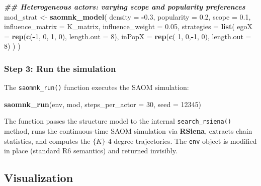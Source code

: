\documentclass[
]{article}
\newenvironment{Shaded}{\begin{snugshade}}{\end{snugshade}}
\newcommand{\AttributeTok}[1]{\textcolor[rgb]{0.13,0.29,0.53}{#1}}
\newcommand{\DecValTok}[1]{\textcolor[rgb]{0.00,0.00,0.81}{#1}}
\newcommand{\DocumentationTok}[1]{\textcolor[rgb]{0.56,0.35,0.01}{\textbf{\textit{#1}}}}
\newcommand{\FloatTok}[1]{\textcolor[rgb]{0.00,0.00,0.81}{#1}}
\newcommand{\FunctionTok}[1]{\textcolor[rgb]{0.13,0.29,0.53}{\textbf{#1}}}
\newcommand{\NormalTok}[1]{#1}
\newcommand{\OtherTok}[1]{\textcolor[rgb]{0.56,0.35,0.01}{#1}}
\newcommand{\SpecialCharTok}[1]{\textcolor[rgb]{0.81,0.36,0.00}{\textbf{#1}}}
\begin{document}
\begin{Shaded}
\begin{Highlighting}[]
\DocumentationTok{\#\# Heterogeneous actors: varying scope and popularity preferences}
\NormalTok{mod\_strat }\OtherTok{\textless{}{-}} \FunctionTok{saomnk\_model}\NormalTok{(}
  \AttributeTok{density    =} \SpecialCharTok{{-}}\FloatTok{0.3}\NormalTok{,}
  \AttributeTok{popularity =}  \FloatTok{0.2}\NormalTok{,}
  \AttributeTok{scope      =}  \FloatTok{0.1}\NormalTok{,}
  \AttributeTok{influence\_matrix =}\NormalTok{ K\_matrix,}
  \AttributeTok{influence\_weight =} \FloatTok{0.05}\NormalTok{,}
  \AttributeTok{strategies =} \FunctionTok{list}\NormalTok{(}
    \AttributeTok{egoX   =} \FunctionTok{rep}\NormalTok{(}\FunctionTok{c}\NormalTok{(}\SpecialCharTok{{-}}\DecValTok{1}\NormalTok{, }\DecValTok{0}\NormalTok{, }\DecValTok{1}\NormalTok{, }\DecValTok{0}\NormalTok{), }\AttributeTok{length.out =} \DecValTok{8}\NormalTok{),}
    \AttributeTok{inPopX =} \FunctionTok{rep}\NormalTok{(}\FunctionTok{c}\NormalTok{( }\DecValTok{1}\NormalTok{, }\DecValTok{0}\NormalTok{,}\SpecialCharTok{{-}}\DecValTok{1}\NormalTok{, }\DecValTok{0}\NormalTok{), }\AttributeTok{length.out =} \DecValTok{8}\NormalTok{)}
\NormalTok{  )}
\NormalTok{)}
\end{Highlighting}
\end{Shaded}

\subsubsection{Step 3: Run the
simulation}\label{step-3-run-the-simulation}

The \texttt{saomnk\_run()} function executes the SAOM simulation:

\begin{Shaded}
\begin{Highlighting}[]
\FunctionTok{saomnk\_run}\NormalTok{(env, mod, }\AttributeTok{steps\_per\_actor =} \DecValTok{30}\NormalTok{, }\AttributeTok{seed =} \DecValTok{12345}\NormalTok{)}
\end{Highlighting}
\end{Shaded}

The function passes the structure model to the internal
\texttt{search\_rsiena()} method, runs the continuous-time SAOM
simulation via \textbf{RSiena}, extracts chain statistics, and computes
the \(\{K\}\)-4 degree trajectories. The \texttt{env} object is modified
in place (standard R6 semantics) and returned invisibly.

\subsection{Visualization}\label{sec:visualization}
\end{document}
